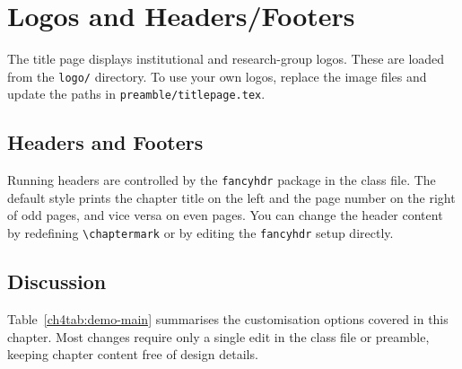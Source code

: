 \section{Logos and Headers/Footers}\label{ch4sec:logos-headers}

The title page displays institutional and research-group logos. These are loaded from the \texttt{logo/} directory. To use your own logos, replace the image files and update the paths in \texttt{preamble/titlepage.tex}.

\begin{figure}[ht]
\centering
{}
\label{ch4fig:results}
\end{figure}

\subsection{Headers and Footers}

Running headers are controlled by the \texttt{fancyhdr} package in the class file. The default style prints the chapter title on the left and the page number on the right of odd pages, and vice versa on even pages. You can change the header content by redefining \verb|\chaptermark| or by editing the \texttt{fancyhdr} setup directly.



\subsection{Discussion}

Table~\ref{ch4tab:demo-main} summarises the customisation options covered in this chapter. Most changes require only a single edit in the class file or preamble, keeping chapter content free of design details.
